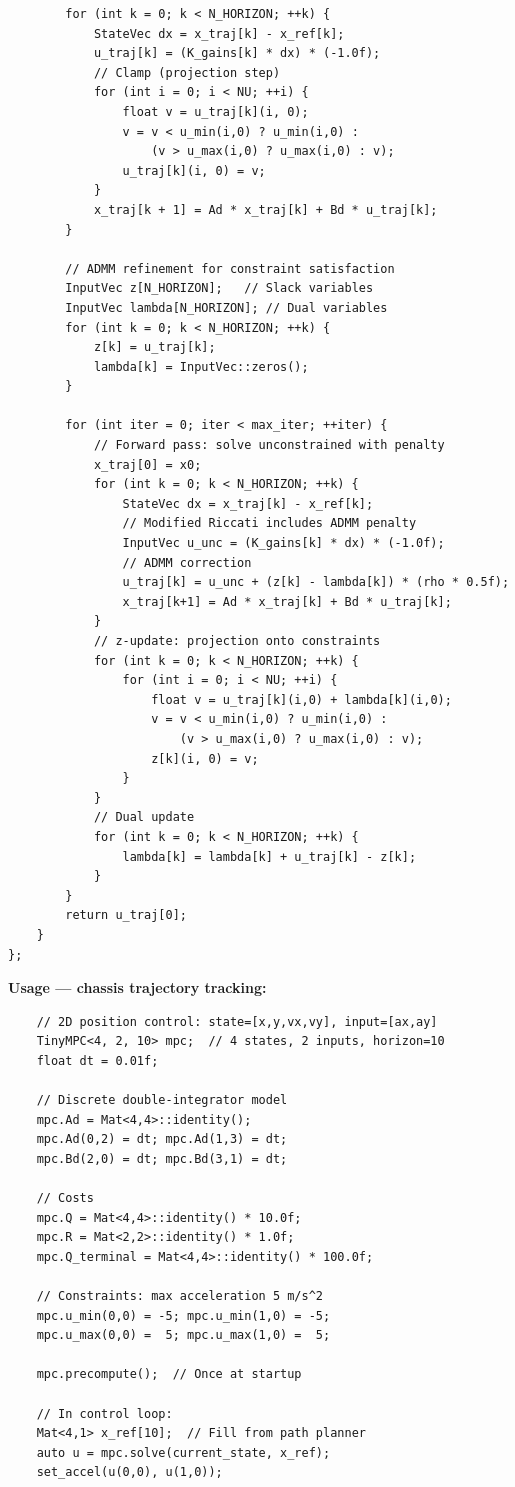 \begin{verbatim}
        for (int k = 0; k < N_HORIZON; ++k) {
            StateVec dx = x_traj[k] - x_ref[k];
            u_traj[k] = (K_gains[k] * dx) * (-1.0f);
            // Clamp (projection step)
            for (int i = 0; i < NU; ++i) {
                float v = u_traj[k](i, 0);
                v = v < u_min(i,0) ? u_min(i,0) :
                    (v > u_max(i,0) ? u_max(i,0) : v);
                u_traj[k](i, 0) = v;
            }
            x_traj[k + 1] = Ad * x_traj[k] + Bd * u_traj[k];
        }

        // ADMM refinement for constraint satisfaction
        InputVec z[N_HORIZON];   // Slack variables
        InputVec lambda[N_HORIZON]; // Dual variables
        for (int k = 0; k < N_HORIZON; ++k) {
            z[k] = u_traj[k];
            lambda[k] = InputVec::zeros();
        }

        for (int iter = 0; iter < max_iter; ++iter) {
            // Forward pass: solve unconstrained with penalty
            x_traj[0] = x0;
            for (int k = 0; k < N_HORIZON; ++k) {
                StateVec dx = x_traj[k] - x_ref[k];
                // Modified Riccati includes ADMM penalty
                InputVec u_unc = (K_gains[k] * dx) * (-1.0f);
                // ADMM correction
                u_traj[k] = u_unc + (z[k] - lambda[k]) * (rho * 0.5f);
                x_traj[k+1] = Ad * x_traj[k] + Bd * u_traj[k];
            }
            // z-update: projection onto constraints
            for (int k = 0; k < N_HORIZON; ++k) {
                for (int i = 0; i < NU; ++i) {
                    float v = u_traj[k](i,0) + lambda[k](i,0);
                    v = v < u_min(i,0) ? u_min(i,0) :
                        (v > u_max(i,0) ? u_max(i,0) : v);
                    z[k](i, 0) = v;
                }
            }
            // Dual update
            for (int k = 0; k < N_HORIZON; ++k) {
                lambda[k] = lambda[k] + u_traj[k] - z[k];
            }
        }
        return u_traj[0];
    }
};
\end{verbatim}

\textbf{Usage --- chassis trajectory tracking:}
\begin{verbatim}
    // 2D position control: state=[x,y,vx,vy], input=[ax,ay]
    TinyMPC<4, 2, 10> mpc;  // 4 states, 2 inputs, horizon=10
    float dt = 0.01f;

    // Discrete double-integrator model
    mpc.Ad = Mat<4,4>::identity();
    mpc.Ad(0,2) = dt; mpc.Ad(1,3) = dt;
    mpc.Bd(2,0) = dt; mpc.Bd(3,1) = dt;

    // Costs
    mpc.Q = Mat<4,4>::identity() * 10.0f;
    mpc.R = Mat<2,2>::identity() * 1.0f;
    mpc.Q_terminal = Mat<4,4>::identity() * 100.0f;

    // Constraints: max acceleration 5 m/s^2
    mpc.u_min(0,0) = -5; mpc.u_min(1,0) = -5;
    mpc.u_max(0,0) =  5; mpc.u_max(1,0) =  5;

    mpc.precompute();  // Once at startup

    // In control loop:
    Mat<4,1> x_ref[10];  // Fill from path planner
    auto u = mpc.solve(current_state, x_ref);
    set_accel(u(0,0), u(1,0));
\end{verbatim}

